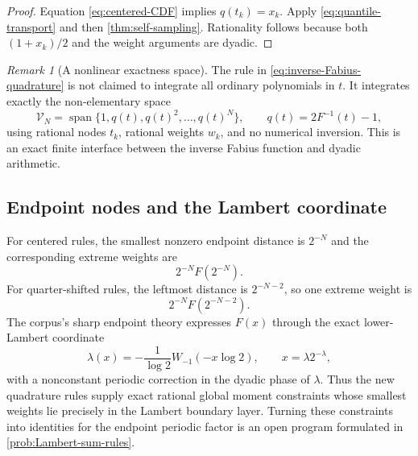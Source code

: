 \documentclass[11pt]{article}
\numberwithin{equation}{section}
\theoremstyle{definition}
\theoremstyle{remark}
\newtheorem{remark}[theorem]{Remark}
\begin{document}
\begin{proof}
Equation \eqref{eq:centered-CDF} implies $q(t_k)=x_k$.  Apply \eqref{eq:quantile-transport} and then \cref{thm:self-sampling}.  Rationality follows because both $(1+x_k)/2$ and the weight arguments are dyadic.
\end{proof}

\begin{remark}[A nonlinear exactness space]
The rule in \eqref{eq:inverse-Fabius-quadrature} is not claimed to integrate all ordinary polynomials in $t$.  It integrates exactly the non-elementary space
\begin{equation}
 \mathcal V_N
 =\operatorname{span}\{1,q(t),q(t)^2,\ldots,q(t)^N\},
 \qquad q(t)=2F^{-1}(t)-1,
 \label{eq:inverse-exactness-space}
\end{equation}
using rational nodes $t_k$, rational weights $w_k$, and no numerical inversion.  This is an exact finite interface between the inverse Fabius function and dyadic arithmetic.
\end{remark}

\subsection{Endpoint nodes and the Lambert coordinate}

For centered rules, the smallest nonzero endpoint distance is $2^{-N}$ and the corresponding extreme weights are
\begin{equation}
 2^{-N}F(2^{-N}).
 \label{eq:centered-extreme-weight}
\end{equation}
For quarter-shifted rules, the leftmost distance is $2^{-N-2}$, so one extreme weight is
\begin{equation}
 2^{-N}F(2^{-N-2}).
 \label{eq:quarter-extreme-weight}
\end{equation}
The corpus's sharp endpoint theory expresses $F(x)$ through the exact lower-Lambert coordinate
\begin{equation}
 \lambda(x)=-\frac1{\log2}W_{-1}(-x\log2),
 \qquad x=\lambda2^{-\lambda},
 \label{eq:Lambert-coordinate}
\end{equation}
with a nonconstant periodic correction in the dyadic phase of $\lambda$.  Thus the new quadrature rules supply exact rational global moment constraints whose smallest weights lie precisely in the Lambert boundary layer.  Turning these constraints into identities for the endpoint periodic factor is an open program formulated in \cref{prob:Lambert-sum-rules}.
\end{document}
